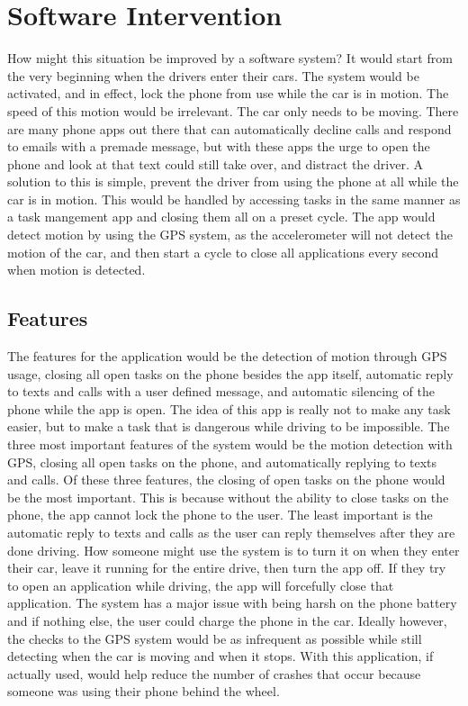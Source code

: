 \documentclass[12pt]{article}
\begin{document}
\section{Software Intervention}
How might this situation be improved by a software system? It would start from the very beginning when the drivers enter their cars. The system would be activated, and in effect, lock the phone from use while the car is in motion. The speed of this motion would be irrelevant. The car only needs to be moving.
There are many phone apps out there that can automatically decline calls and respond to emails with a premade message, but with these apps the urge to open the phone and look at that text could still take over, and distract the driver. A solution to this is simple, prevent the driver from using the phone at all while the car is in motion. This would be handled by accessing tasks in the same manner as a task mangement app and closing them all on a preset cycle. The app would detect motion by using the GPS system, as the accelerometer will not detect the motion of the car, and then start a cycle to close all applications every second when motion is detected.
\subsection{Features}
The features for the application would be the detection of motion through GPS usage, closing all open tasks on the phone besides the app itself, automatic reply to texts and calls with a user defined message, and automatic silencing of the phone while the app is open.
The idea of this app is really not to make any task easier, but to make a task that is dangerous while driving to be impossible.
The three most important features of the system would be the motion detection with GPS, closing all open tasks on the phone, and automatically replying to texts and calls. Of these three features, the closing of open tasks on the phone would be the most important. This is because without the ability to close tasks on the phone, the app cannot lock the phone to the user. The least important is the automatic reply to texts and calls as the user can reply themselves after they are done driving.
How someone might use the system is to turn it on when they enter their car, leave it running for the entire drive, then turn the app off. If they try to open an application while driving, the app will forcefully close that application.
The system has a major issue with being harsh on the phone battery and if nothing else, the user could charge the phone in the car. Ideally however, the checks to the GPS system would be as infrequent as possible while still detecting when the car is moving and when it stops.
With this application, if actually used, would help reduce the number of crashes that occur because someone was using their phone behind the wheel.
\end{document}
